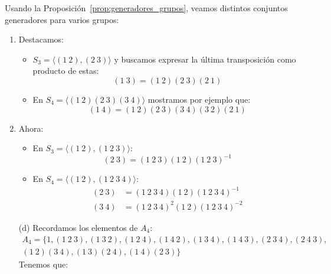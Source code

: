 \begin{ejemplo}
    Usando la Proposición~\ref{prop:generadores_grupos}, veamos distintos conjuntos generadores para varios grupos:
    \begin{enumerate}[label=(\alph*)]
        \item Destacamos:
        \begin{itemize}
            \item $S_3 = \langle (1\ 2), (2\ 3) \rangle $ y buscamos expresar la última transposición como producto de estas:
                \begin{equation*}
                    (1\ 3) = (1\ 2)(2\ 3)(2\ 1)
                \end{equation*}
            \item En $S_4 = \langle (1\ 2)(2\ 3)(3\ 4) \rangle $ mostramos por ejemplo que:
                \begin{equation*}
                    (1\ 4) = (1\ 2)(2\ 3)(3\ 4)(3\ 2)(2\ 1)
                \end{equation*}
        \end{itemize}
        \item Ahora:
            \begin{itemize}
                \item En $S_3 = \langle (1\ 2), (1\ 2\ 3) \rangle $:
                    \begin{equation*}
                        (2\ 3) = (1\ 2\ 3)(1\ 2){(1\ 2\ 3)}^{-1}
                    \end{equation*}
                \item En $S_4 = \langle (1\ 2), (1\ 2\ 3\ 4) \rangle $:
                    \begin{align*}
                        (2\ 3) &= (1\ 2\ 3\ 4)(1\ 2){(1\ 2\ 3\ 4)}^{-1} \\
                        (3\ 4) &= {(1\ 2\ 3\ 4)}^{2}(1\ 2){(1\ 2\ 3\ 4)}^{-2}
                    \end{align*}
            \end{itemize}
        \item[(d)] Recordamos los elementos de $A_4$:
                \begin{multline*}
                     A_4 = \{ 1, (1\ 2\ 3), (1\ 3\ 2), (1\ 2\ 4), (1\ 4\ 2), (1\ 3\ 4), (1\ 4\ 3), (2\ 3\ 4), (2\ 4\ 3),\\ (1\ 2)(3\ 4), (1\ 3)(2\ 4), (1\ 4)(2\ 3) \} 
                \end{multline*}
                Tenemos que:
                \begin{equation*}

\end{equation*}
\end{enumerate}
\end{ejemplo}
